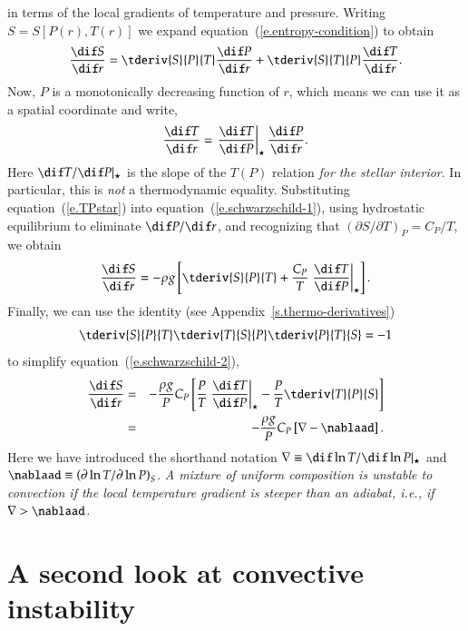  in terms of the local gradients of temperature and pressure. Writing $S = S[P(r),T(r)]$ we expand equation~(\ref{e.entropy-condition}) to obtain
\begin{equation}\label{e.schwarzschild-1}
\frac{\dif S}{\dif r} = \tderiv{S}{P}{T} \frac{\dif P}{\dif r} + \tderiv{S}{T}{P}\frac{\dif T}{\dif r} .
\end{equation}
Now, $P$ is a monotonically decreasing function of $r$, which means we can use it as a spatial coordinate and write,
\begin{equation}\label{e.TPstar}
\frac{\dif T}{\dif r} = \TPstar \frac{\dif P}{\dif r} .
\end{equation}
Here $\dif T/\dif P|_{\star}$ is the slope of the $T(P)$ relation \emph{for the stellar interior}.  In particular, this is \emph{not} a thermodynamic equality. Substituting equation~(\ref{e.TPstar}) into equation~(\ref{e.schwarzschild-1}), using hydrostatic equilibrium to eliminate $\dif P/\dif r$, and recognizing that $(\partial S/\partial T)_{P} = C_{P}/T$, we obtain
\begin{equation}\label{e.schwarzschild-2}
\frac{\dif S}{\dif r} =  -\rho g\left[\tderiv{S}{P}{T} + \frac{C_{P}}{T} \TPstar \right].
\end{equation}
Finally, we can use the identity (see Appendix~\ref{s.thermo-derivatives})
\begin{equation}
\tderiv{S}{P}{T}\tderiv{T}{S}{P}\tderiv{P}{T}{S} = -1
\end{equation}
to simplify equation~(\ref{e.schwarzschild-2}),
\begin{eqnarray}
\frac{\dif S}{\dif r} &=& -\frac{\rho g}{P}C_{P}\left[\frac{P}{T}\TPstar - \frac{P}{T}\tderiv{T}{P}{S}\right]\nonumber \\
 & = & -\frac{\rho g}{P}C_{P}\left[\nabla - \nablaad\right].
 \label{e.schwarzschild}
\end{eqnarray}
Here we have introduced the shorthand notation $\nabla\equiv \dif \ln T/\dif\ln P|_{\star}$ and $\nablaad \equiv \left(\partial \ln T/\partial\ln P\right)_{S}$.
\emph{A mixture of uniform composition is unstable to convection if the local temperature gradient is steeper than an adiabat, i.e., if $\nabla > \nablaad$.}

\section{A second look at convective instability}\label{s.convection-second-look}

